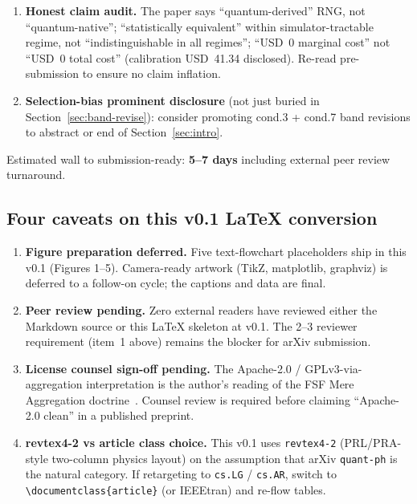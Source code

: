 \begin{enumerate}
  \texttt{state/qmirror\_license\_audit\_2026\_05\_03/audit.json}.
  \textbf{Final counsel review pending} for paper claim language.
\item \textbf{Honest claim audit.} The paper says ``quantum-derived''
  RNG, not ``quantum-native''; ``statistically equivalent'' within
  simulator-tractable regime, not ``indistinguishable in all
  regimes''; ``USD~0 marginal cost'' not ``USD~0 total cost''
  (calibration USD~41.34 disclosed). Re-read pre-submission to
  ensure no claim inflation.
\item \textbf{Selection-bias prominent disclosure} (not just buried
  in Section~\ref{sec:band-revise}): consider promoting cond.3 +
  cond.7 band revisions to abstract or end of
  Section~\ref{sec:intro}.
\end{enumerate}

Estimated wall to submission-ready: \textbf{5--7 days} including
external peer review turnaround.

\subsection*{Four caveats on this v0.1 LaTeX conversion}

\begin{enumerate}
\item \textbf{Figure preparation deferred.} Five text-flowchart
  placeholders ship in this v0.1 (Figures 1--5). Camera-ready
  artwork (TikZ, matplotlib, graphviz) is deferred to a follow-on
  cycle; the captions and data are final.
\item \textbf{Peer review pending.} Zero external readers have
  reviewed either the Markdown source or this LaTeX skeleton at
  v0.1. The 2--3 reviewer requirement (item~1 above) remains the
  blocker for arXiv submission.
\item \textbf{License counsel sign-off pending.} The
  Apache-2.0 / GPLv3-via-aggregation interpretation is the
  author's reading of the FSF Mere Aggregation
  doctrine~\cite{FSF-MereAggregation}. Counsel review is required
  before claiming ``Apache-2.0 clean'' in a published preprint.
\item \textbf{revtex4-2 vs article class choice.} This v0.1 uses
  \texttt{revtex4-2} (PRL/PRA-style two-column physics layout) on
  the assumption that arXiv \texttt{quant-ph} is the natural
  category. If retargeting to \texttt{cs.LG} / \texttt{cs.AR},
  switch to \texttt{\textbackslash documentclass\{article\}} (or
  IEEEtran) and re-flow tables.
\end{enumerate}
